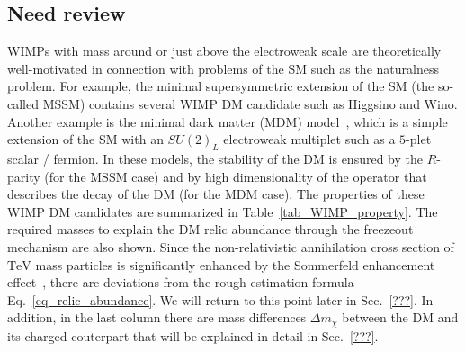 \documentclass[12pt,twoside,book]{article}
\begin{document}
\subsection{Need review}

WIMPs with mass around or just above the electroweak scale are
theoretically well-motivated in connection with problems of the SM such
as the naturalness problem.  For example, the minimal supersymmetric
extension of the SM (the so-called MSSM) contains several WIMP DM
candidate such as Higgsino and Wino.
Another example is the minimal dark matter (MDM)
model~\cite{Cirelli:2005uq, Cirelli:2007xd, Cirelli:2009uv}, which is a
simple extension of the SM with an $SU(2)_L$ electroweak multiplet such
as a $5$-plet scalar / fermion.  In these models, the stability of the
DM is ensured by the $R$-parity (for the MSSM case) and by high
dimensionality of the operator that describes the decay of the DM (for
the MDM case).  The properties of these WIMP DM candidates are
summarized in Table~\ref{tab_WIMP_property}.  The required masses to
explain the DM relic abundance through the freezeout mechanism are also
shown.  Since the non-relativistic annihilation cross section of
$\mathrm{TeV}$ mass particles is significantly enhanced by the
Sommerfeld enhancement effect~\cite{Hisano:2004ds, Hisano:2006nn}, there
are deviations from the rough estimation formula
Eq.~\eqref{eq_relic_abundance}.  We will return to this point later in
Sec.~\ref{???}.    In addition, in the last column there
are mass differences $\Delta m_\chi$ between the DM and its charged
couterpart that will be explained in detail in Sec.~\ref{???}.


% 
% 
\end{document}
